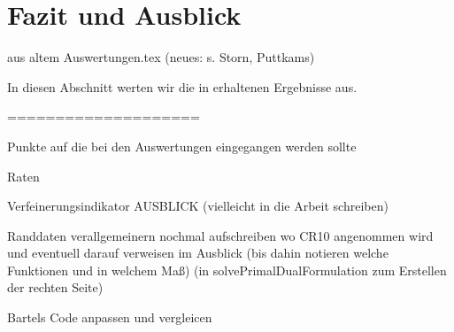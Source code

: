 \section{Fazit und Ausblick}

aus altem Auswertungen.tex (neues: s. Storn, Puttkams)

In diesen Abschnitt werten wir die in  erhaltenen
Ergebnisse aus.



====================

Punkte auf die bei den Auswertungen eingegangen werden sollte

Raten

Verfeinerungsindikator
AUSBLICK (vielleicht in die Arbeit schreiben)
  
  Randdaten verallgemeinern
    nochmal aufschreiben wo CR10 angenommen wird und eventuell darauf verweisen 
    im Ausblick (bis dahin notieren welche Funktionen und in welchem Maß)
    (in solvePrimalDualFormulation zum Erstellen der rechten Seite)
    
  Bartels Code anpassen und vergleicen




